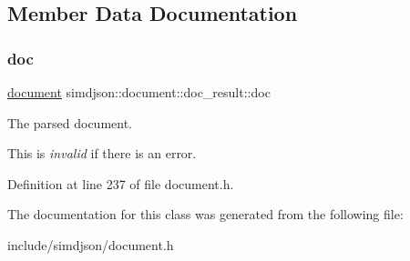 \subsection{Member Data Documentation}
\mbox{\label{classsimdjson_1_1document_1_1doc__result_ad12726cc5708b5af4684795344a5fce4}} 
\subsubsection{\texorpdfstring{doc}{doc}}
{\footnotesize\ttfamily \hyperlink{classsimdjson_1_1document}{document} simdjson\+::document\+::doc\+\_\+result\+::doc}



The parsed document. 

This is {\itshape invalid} if there is an error. 

Definition at line 237 of file document.\+h.



The documentation for this class was generated from the following file\+:\begin{DoxyCompactItemize}
\item 
include/simdjson/document.\+h\end{DoxyCompactItemize}
